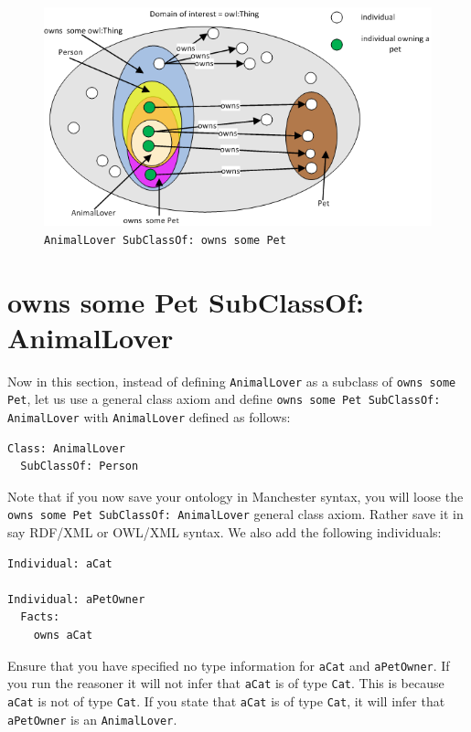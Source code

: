 \documentclass{amsart}
\begin{document}
    \begin{figure}
      \centering \includegraphics[trim = 0mm 0mm 0mm 0mm, clip, scale=0.6]{./SubClassOfOwnsSomePet.png}
      \caption{\texttt{AnimalLover SubClassOf: owns some Pet}}\label{fig_SubClassOfOwnsSomePet}
    \end{figure} 
  
  \section{owns some Pet SubClassOf: AnimalLover}
  Now in this section, instead of defining \texttt{AnimalLover} as a subclass of \texttt{owns some Pet}, let us use a general class axiom and define \texttt{owns some Pet SubClassOf: AnimalLover} with \texttt{AnimalLover} defined as follows:
\begin{small}
\begin{verbatim} 
Class: AnimalLover
  SubClassOf: Person
\end{verbatim}
\end{small}   
Note that if you now save your ontology in Manchester syntax, you will loose the \texttt{owns some Pet SubClassOf: AnimalLover} general class axiom. Rather save it in say RDF/XML or OWL/XML syntax. We also add the following individuals:
\begin{small}
\begin{verbatim} 
Individual: aCat

Individual: aPetOwner
  Facts: 
    owns aCat
\end{verbatim}
\end{small}  
Ensure that you have specified no type information for \texttt{aCat} and \texttt{aPetOwner}. If you run the reasoner it will not infer that \texttt{aCat} is of type \texttt{Cat}. This is because \texttt{aCat} is not of type \texttt{Cat}. If you state that \texttt{aCat} is of type \texttt{Cat}, it will infer that \texttt{aPetOwner} is an \texttt{AnimalLover}.
\end{document}
